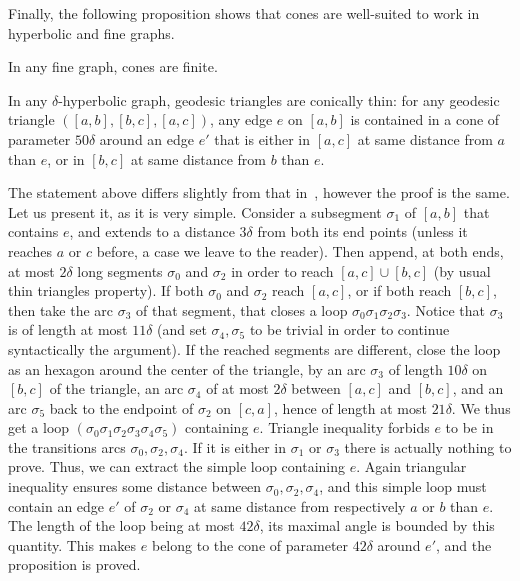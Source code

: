 Finally, the following proposition shows that cones are well-suited to work in hyperbolic and fine graphs.

\begin{prop} \label{prop;cones_are_nicer}
In any fine graph, cones are finite.

In any $\delta$-hyperbolic graph, geodesic triangles are conically thin: for any geodesic triangle $([a,b], [b,c], [a,c])$, any edge $e$ on $[a,b]$ is contained in a cone of parameter $50\delta$ around an edge $e'$ that is either in $[a,c]$ at same distance from $a$ than $e$, or in $[b,c]$ at same distance from $b$ than $e$.
\end{prop}

The statement above differs slightly from that in~\cite[\S2.3] {DYaman}, however the proof is the same. Let us present it, as it is very simple. Consider a subsegment $\sigma_1$ of $[a,b]$ that contains $e$, and extends to a distance $3\delta$ from both its end points (unless it reaches $a$ or $c$ before, a case we leave to the reader). Then append, at both ends, at most $2\delta$ long segments $\sigma_0$ and $\sigma_2$ in order to reach $[a,c] \cup [b,c]$ (by usual thin triangles property). If both $\sigma_0$ and $\sigma_2$ reach $[a,c]$, or if both reach $ [b,c]$, then take the arc $\sigma_3$ of that segment, that closes a loop $\sigma_0\sigma_1\sigma_2\sigma_3$. Notice that $\sigma_3$ is of length at most $11\delta$ (and set $\sigma_4, \sigma_5$ to be trivial in order to continue syntactically the argument). If the reached segments are different, close the loop as an hexagon around the center of the triangle, by an arc $\sigma_3$ of length $10\delta$ on $[b,c]$ of the triangle, an arc $\sigma_4$ of at most $2\delta$ between $[a,c]$ and $ [b,c]$, and an arc $\sigma_5$ back to the endpoint of $\sigma_2$ on $[c,a]$, hence of length at most $21\delta$. We thus get a loop $(\sigma_0\sigma_1\sigma_2\sigma_3\sigma_4\sigma_5)$ containing $e$. Triangle inequality forbids $e$ to be in the transitions arcs $\sigma_0, \sigma_2, \sigma_4$. If it is either in $\sigma_1$ or $\sigma_3$ there is actually nothing to prove. Thus, we can extract the simple loop containing $e$. Again triangular inequality ensures some distance between $\sigma_0, \sigma_2, \sigma_4$, and this simple loop must contain an edge $e'$ of $\sigma_2$ or $\sigma_4$ at same distance from respectively $a$ or $b$ than $e$. The length of the loop being at most $42\delta$, its maximal angle is bounded by this quantity. This makes $e$ belong to the cone of parameter $42\delta$ around $e'$, and the proposition is proved.

